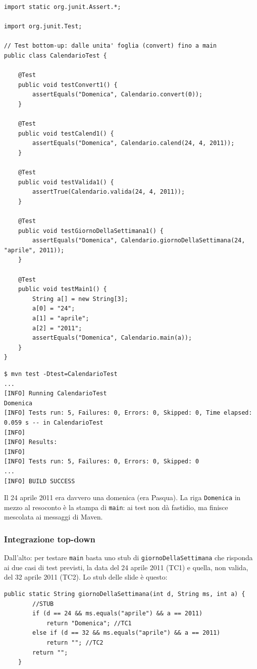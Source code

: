\begin{lstlisting}[style=java, name=CalendarioTest.java]
import static org.junit.Assert.*;

import org.junit.Test;

// Test bottom-up: dalle unita' foglia (convert) fino a main
public class CalendarioTest {

    @Test
    public void testConvert1() {
        assertEquals("Domenica", Calendario.convert(0));
    }

    @Test
    public void testCalend1() {
        assertEquals("Domenica", Calendario.calend(24, 4, 2011));
    }

    @Test
    public void testValida1() {
        assertTrue(Calendario.valida(24, 4, 2011));
    }

    @Test
    public void testGiornoDellaSettimana1() {
        assertEquals("Domenica", Calendario.giornoDellaSettimana(24, "aprile", 2011));
    }

    @Test
    public void testMain1() {
        String a[] = new String[3];
        a[0] = "24";
        a[1] = "aprile";
        a[2] = "2011";
        assertEquals("Domenica", Calendario.main(a));
    }
}
\end{lstlisting}

\begin{lstlisting}[style=shell, name=Terminale]
$ mvn test -Dtest=CalendarioTest
...
[INFO] Running CalendarioTest
Domenica
[INFO] Tests run: 5, Failures: 0, Errors: 0, Skipped: 0, Time elapsed: 0.059 s -- in CalendarioTest
[INFO]
[INFO] Results:
[INFO]
[INFO] Tests run: 5, Failures: 0, Errors: 0, Skipped: 0
...
[INFO] BUILD SUCCESS
\end{lstlisting}

Il 24 aprile 2011 era davvero una domenica (era Pasqua). La riga \texttt{Domenica} in mezzo al resoconto è la stampa
di \texttt{main}: ai test non dà fastidio, ma finisce mescolata ai messaggi di Maven.

\subsubsection*{Integrazione top-down}

Dall'alto: per testare \texttt{main} basta uno stub di \texttt{giornoDellaSettimana} che risponda ai due casi di test
previsti, la data del 24 aprile 2011 (TC1) e quella, non valida, del 32 aprile 2011 (TC2). Lo stub delle slide è questo:

\begin{lstlisting}[style=java, name=Calendario.java, firstnumber=16]
    public static String giornoDellaSettimana(int d, String ms, int a) {
        //STUB
        if (d == 24 && ms.equals("aprile") && a == 2011)
            return "Domenica"; //TC1
        else if (d == 32 && ms.equals("aprile") && a == 2011)
            return ""; //TC2
        return "";
    }
\end{lstlisting}

